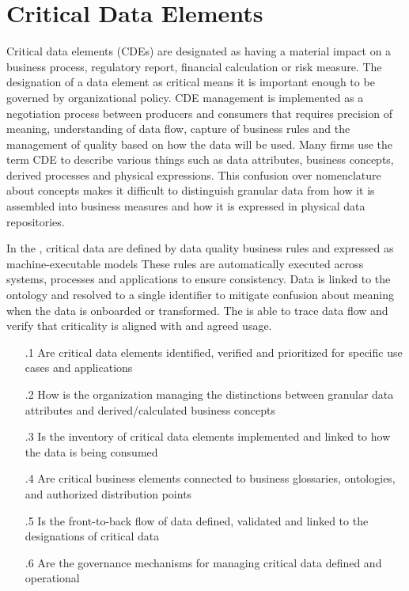 \section{Critical Data Elements}\label{sec:ekgmm-b-4-5} %

Critical data elements (CDEs) are designated as having a material impact on a business process, regulatory report, financial calculation or risk measure.
The designation of a data element as critical means it is important enough to be governed by organizational policy.
CDE management is implemented as a negotiation process between producers and consumers that requires precision of meaning,
understanding of data flow, capture of business rules and the management of quality based on how the data will be used.
Many firms use the term CDE to describe various things such as data attributes, business concepts, derived processes and physical expressions.
This confusion over nomenclature about concepts makes it difficult to distinguish granular data from how it is assembled into business measures and how it is expressed in physical data repositories.

\kgmmekgrationalesection

In the , critical data are defined by data quality business rules and expressed as machine-executable models
These rules are automatically executed across systems, processes and applications to ensure consistency.
Data is linked to the ontology and resolved to a single identifier to mitigate confusion about meaning when the data is onboarded or transformed.
The  is able to trace data flow and verify that criticality is aligned with  and agreed usage.

\kgmmcorequestionssection

\begin{itemize}[leftmargin=.5in]

  \item [\thesection.1] Are critical data elements identified, verified and prioritized for specific use cases and applications
  \item [\thesection.2] How is the organization managing the distinctions between granular data attributes and derived/calculated business concepts
  \item [\thesection.3] Is the inventory of critical data elements implemented and linked to how the data is being consumed
  \item [\thesection.4] Are critical business elements connected to business glossaries, ontologies,  and authorized distribution points
  \item [\thesection.5] Is the front-to-back flow of data defined, validated and linked to the designations of critical data
  \item [\thesection.6] Are the governance mechanisms for managing critical data defined and operational

\end{itemize}
